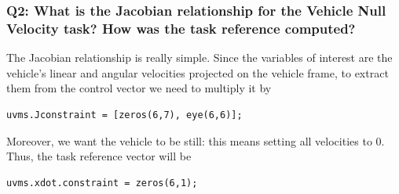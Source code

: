 \documentclass{article}
\begin{document}
\subsubsection{Q2: What is the Jacobian relationship for the Vehicle Null Velocity task? How was the task reference computed?}
The Jacobian relationship is really simple. Since the variables of interest are the vehicle's linear and angular velocities projected on the vehicle frame, to extract them from the control vector we need to multiply it by
\begin{lstlisting}
uvms.Jconstraint = [zeros(6,7), eye(6,6)];
\end{lstlisting}
Moreover, we want the vehicle to be still: this means setting all velocities to 0. Thus, the task reference vector will be
\begin{lstlisting}
uvms.xdot.constraint = zeros(6,1);
\end{lstlisting}
\end{document}
